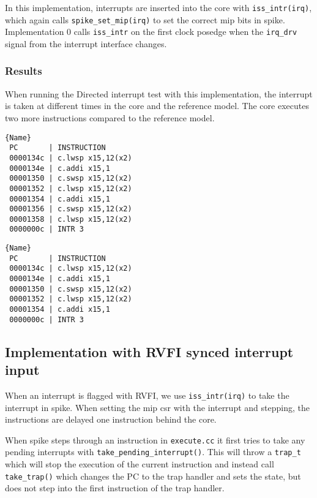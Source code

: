 In this implementation, interrupts are inserted into the core with \lstinline{iss_intr(irq)}, which again calls \lstinline{spike_set_mip(irq)} to set the correct mip bits in spike. 
Implementation 0 calls \lstinline{iss_intr} on the first clock posedge when the \lstinline{irq_drv} signal from the interrupt interface changes.

\subsubsection{Results}

When running the Directed interrupt test with this implementation, the interrupt is taken at different times in the core and the reference model. The core executes two more instructions compared to the reference model. 


\begin{minipage}{.45\textwidth}
\vspace*{0pt}
\begin{lstlisting}[caption=Core,frame=tlrb]{Name}
 PC       | INSTRUCTION
 0000134c | c.lwsp x15,12(x2)
 0000134e | c.addi x15,1
 00001350 | c.swsp x15,12(x2)
 00001352 | c.lwsp x15,12(x2)
 00001354 | c.addi x15,1
 00001356 | c.swsp x15,12(x2)
 00001358 | c.lwsp x15,12(x2)
 0000000c | INTR 3
\end{lstlisting}
\end{minipage}\hfill
\begin{minipage}{.45\textwidth}
\vspace*{0pt}
\begin{lstlisting}[caption=RM,frame=tlrb]{Name}
 PC       | INSTRUCTION
 0000134c | c.lwsp x15,12(x2)
 0000134e | c.addi x15,1
 00001350 | c.swsp x15,12(x2)
 00001352 | c.lwsp x15,12(x2)
 00001354 | c.addi x15,1
 0000000c | INTR 3
\end{lstlisting}
\end{minipage}



\subsection{Implementation with RVFI synced interrupt input}

When an interrupt is flagged with RVFI, we use \lstinline{iss_intr(irq)} to take the interrupt in spike. When setting the mip csr with the interrupt and stepping, the instructions are delayed one instruction behind the core.

When spike steps through an instruction in \lstinline{execute.cc} it first tries to take any pending interrupts with \lstinline{take_pending_interrupt()}. This will throw a \lstinline{trap_t} which will stop the execution of the current instruction and instead call \lstinline{take_trap()} which changes the PC to the trap handler and sets the state, but does not step into the first instruction of the trap handler. 

